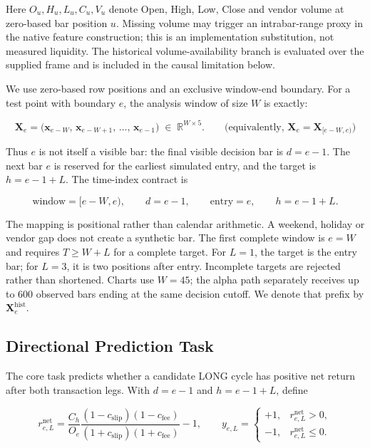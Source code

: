Here $O_u,H_u,L_u,C_u,V_u$ denote Open, High, Low, Close and vendor volume at zero-based bar position $u$. Missing volume may trigger an intrabar-range proxy in the native feature construction; this is an implementation substitution, not measured liquidity. The historical volume-availability branch is evaluated over the supplied frame and is included in the causal limitation below.

We use zero-based row positions and an exclusive window-end boundary. For a test point with boundary $e$, the analysis window of size $W$ is exactly:

\begin{equation}
    \mathbf{X}_{e} = \bigl(\mathbf{x}_{e-W},\,
                           \mathbf{x}_{e-W+1},\, \ldots,\,
                           \mathbf{x}_{e-1}\bigr)
    \;\in\; \mathbb{R}^{W \times 5}.
    \qquad\text{(equivalently, }\mathbf{X}_{e}=\mathbf{X}_{[e-W,e)}\text{)}
\end{equation}


Thus $e$ is not itself a visible bar: the final visible decision bar is $d=e-1$. The next bar $e$ is reserved for the earliest simulated entry, and the target is $h=e-1+L$. The time-index contract is

\begin{equation}
    \boxed{\quad
    \text{window}=[e-W,e),\qquad d=e-1,\qquad
    \text{entry}=e,\qquad h=e-1+L.\quad}
    \label{eq:time_index_contract}
\end{equation}


The mapping is positional rather than calendar arithmetic. A weekend, holiday or vendor gap does not create a synthetic bar. The first complete window is $e=W$ and requires $T\ge W+L$ for a complete target. For $L=1$, the target is the entry bar; for $L=3$, it is two positions after entry. Incomplete targets are rejected rather than shortened. Charts use $W=45$; the alpha path separately receives up to 600 observed bars ending at the same decision cutoff. We denote that prefix by $\mathbf{X}^{\mathrm{hist}}_e$.

\subsection{Directional Prediction Task}
The core task predicts whether a candidate LONG cycle has positive net return after both transaction legs. With $d=e-1$ and $h=e-1+L$, define

\begin{equation}
    r^{\mathrm{net}}_{e,L}
    =\frac{C_h}{O_e}
      \frac{(1-c_{\mathrm{slip}})(1-c_{\mathrm{fee}})}
           {(1+c_{\mathrm{slip}})(1+c_{\mathrm{fee}})}-1,
    \qquad
    y_{e,L}=
    \begin{cases}
        +1, & r^{\mathrm{net}}_{e,L}>0,\\
        -1, & r^{\mathrm{net}}_{e,L}\leq 0.
    \end{cases}
    \label{eq:label}
\end{equation}


